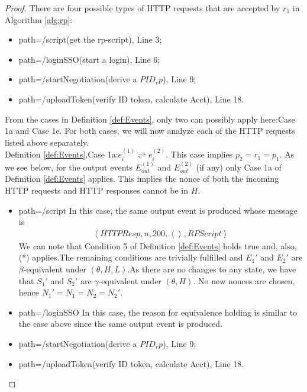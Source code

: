 \documentclass[letterpaper,onecolumn,10pt]{article}
\begin{document}
\begin{proof}
  There are four possible types of HTTP requests that are accepted by $r_1$ in Algorithm \ref{alg:rp}:
  \begin{itemize}
    \item path=/script(get the rp-script), Line 3;
    \item path=/loginSSO(start a login), Line 6;
    \item path=/startNegotiation(derive a $PID_rp$), Line 9;
    \item path=/uploadToken(verify ID token, calculate Acct), Line 18.
  \end{itemize}
  \par From the cases in Definition \ref{def:Events}, only two can possibly apply here:Case 1a and Case 1e. For both cases, we will now analyze each of the HTTP requests listed above separately.\\
  Definition \ref{def:Events},Case 1a:$e_i^{(1)}\rightleftharpoons e_i^{(2)}$. This case implies $p_2=r_1=p_1$. As we see below, for the output events $E_{out}^{(1)}$ and $E_{out}^{(2)}$ (if any) only Case 1a of Definition \ref{def:Events} applies. This implies the nonce of both the incoming HTTP requests and HTTP responses cannot be in $H$.
  \begin{itemize}
    \item path=/script In this case, the same output event is produced whose message is 
    \begin{equation}
      \begin{aligned}
        \left\langle HTTPResp,n,200,\left\langle\right\rangle,RPScript\right\rangle
      \end{aligned}
    \end{equation}
    We can note that Condition 5 of Definition \ref{def:Events} holds true and, also, (*) applies.The remaining conditions are trivially fulfilled and $E_1\prime$ and $E_2\prime$ are $\beta$-equivalent under $(\theta,H,L)$.As there are no changes to any state, we have that $S_1\prime$ and $S_2\prime$ are $\gamma$-equivalent under $(\theta,H)$. No new nonces are chosen, hence $N_1\prime=N_1=N_2=N_2\prime$.
    \item path=/loginSSO In this case, the reason for equivalence holding is similar to the case above since the same output event is produced.
    \item path=/startNegotiation(derive a $PID_rp$), Line 9;
    \item path=/uploadToken(verify ID token, calculate Acct), Line 18.
  \end{itemize}
\end{proof}



\end{document}
